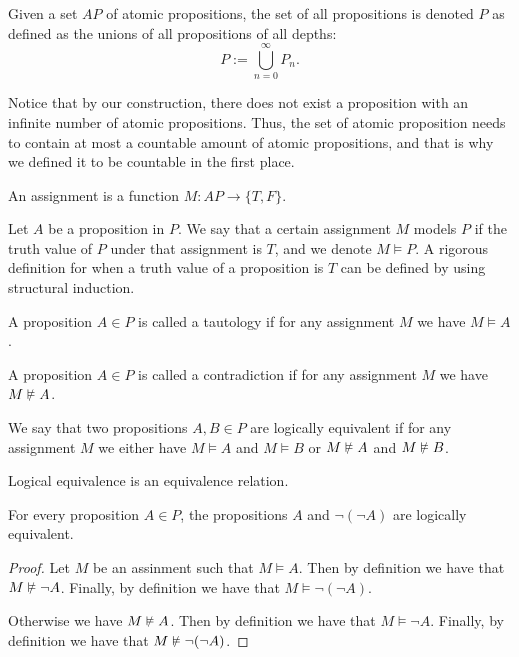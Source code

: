 \documentclass[11pt,a4paper]{article}
\DeclareRobustCommand{\models}{%
  \mathrel{\vDash}%
}
\DeclareRobustCommand{\nmodels}{%
  \mathrel{\text{\ooalign{$\vDash$\cr\hss\raisebox{0.2ex}{\scalebox{0.8}{$/$}}\hss}}}%
}
\begin{document}
\begin{definition}
  Given a set $AP$ of atomic propositions, the set of all propositions
  is denoted $P$ as defined as the unions of all propositions of all
  depths:
  \[
    P := \bigcup_{n=0}^{\infty} P_n.
  \]
\end{definition}

\begin{remark}
  Notice that by our construction, there does not exist a proposition
  with an infinite number of atomic propositions. Thus, the set of
  atomic proposition needs to contain at most a countable amount
  of atomic propositions, and that is why we defined it to be
  countable in the first place.
\end{remark}

\begin{definition}[Assignment]
  An assignment is a function $M \colon AP \to \{T,F\}$.
\end{definition}

Let $A$ be a proposition in $P$.
We say that a certain assignment $M$ models $P$ if the truth
value of $P$ under that assignment is $T$, and we denote $M \models P$.
A rigorous definition for when a truth value of a proposition is $T$ 
can be defined by using structural induction.

\begin{definition}[Tautology]
  A proposition $A \in P$ is called a tautology if for any assignment
  $M$ we have $M \models A$.
\end{definition}

\begin{definition}[Contradiction]
  A proposition $A \in P$ is called a contradiction if for any assignment
  $M$ we have $M \nmodels A$.
\end{definition}

\begin{definition}
  We say that two propositions $A,B \in P$ are logically equivalent
  if for any assignment $M$ we either have $M \models A$ and
  $M \models B$ or $M \nmodels A$ and $M \nmodels B$.
\end{definition}

\begin{remark}
  Logical equivalence is an equivalence relation.
\end{remark}

\begin{proposition}
  For every proposition $A \in P$, the propositions $A$ and
  $\neg(\neg A)$ are logically equivalent.
\end{proposition}
\begin{proof}
  Let $M$ be an assinment such that $M \models A$.
  Then by definition we have that $M \nmodels \neg A$.
  Finally, by definition we have that $M \models \neg(\neg A)$.

  Otherwise we have $M \nmodels A$.
  Then by definition we have that $M \models \neg A$.
  Finally, by definition we have that $M \nmodels \neg(\neg A)$.
\end{proof}
\end{document}
